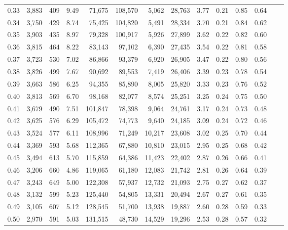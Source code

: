 \begin{tabular}{rrrrrrrrrrrrrr}
0.33 &  3,883 &  409 &    9.49 &   71,675 &  108,570 &   5,062 &  28,763 &  3.77 &  0.21 &  0.85 &      0.64 \\
0.34 &  3,750 &  429 &    8.74 &   75,425 &  104,820 &   5,491 &  28,334 &  3.70 &  0.21 &  0.84 &      0.62 \\
0.35 &  3,903 &  435 &    8.97 &   79,328 &  100,917 &   5,926 &  27,899 &  3.62 &  0.22 &  0.82 &      0.60 \\
0.36 &  3,815 &  464 &    8.22 &   83,143 &   97,102 &   6,390 &  27,435 &  3.54 &  0.22 &  0.81 &      0.58 \\
0.37 &  3,723 &  530 &    7.02 &   86,866 &   93,379 &   6,920 &  26,905 &  3.47 &  0.22 &  0.80 &      0.56 \\
0.38 &  3,826 &  499 &    7.67 &   90,692 &   89,553 &   7,419 &  26,406 &  3.39 &  0.23 &  0.78 &      0.54 \\
0.39 &  3,663 &  586 &    6.25 &   94,355 &   85,890 &   8,005 &  25,820 &  3.33 &  0.23 &  0.76 &      0.52 \\
0.40 &  3,813 &  569 &    6.70 &   98,168 &   82,077 &   8,574 &  25,251 &  3.25 &  0.24 &  0.75 &      0.50 \\
0.41 &  3,679 &  490 &    7.51 &  101,847 &   78,398 &   9,064 &  24,761 &  3.17 &  0.24 &  0.73 &      0.48 \\
0.42 &  3,625 &  576 &    6.29 &  105,472 &   74,773 &   9,640 &  24,185 &  3.09 &  0.24 &  0.72 &      0.46 \\
0.43 &  3,524 &  577 &    6.11 &  108,996 &   71,249 &  10,217 &  23,608 &  3.02 &  0.25 &  0.70 &      0.44 \\
0.44 &  3,369 &  593 &    5.68 &  112,365 &   67,880 &  10,810 &  23,015 &  2.95 &  0.25 &  0.68 &      0.42 \\
0.45 &  3,494 &  613 &    5.70 &  115,859 &   64,386 &  11,423 &  22,402 &  2.87 &  0.26 &  0.66 &      0.41 \\
0.46 &  3,206 &  660 &    4.86 &  119,065 &   61,180 &  12,083 &  21,742 &  2.81 &  0.26 &  0.64 &      0.39 \\
0.47 &  3,243 &  649 &    5.00 &  122,308 &   57,937 &  12,732 &  21,093 &  2.75 &  0.27 &  0.62 &      0.37 \\
0.48 &  3,132 &  599 &    5.23 &  125,440 &   54,805 &  13,331 &  20,494 &  2.67 &  0.27 &  0.61 &      0.35 \\
0.49 &  3,105 &  607 &    5.12 &  128,545 &   51,700 &  13,938 &  19,887 &  2.60 &  0.28 &  0.59 &      0.33 \\
0.50 &  2,970 &  591 &    5.03 &  131,515 &   48,730 &  14,529 &  19,296 &  2.53 &  0.28 &  0.57 &      0.32 \\

\end{tabular}
